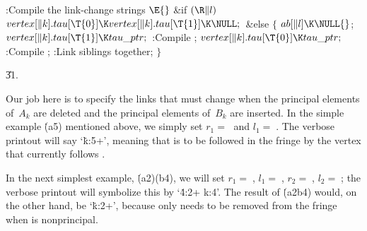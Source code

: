 \B{}:Compile the link-change strings \X${}\E{}$\6
\&{if} ${}(\R\|l){}$\1\5
${}\\{vertex}[\|k].\\{tau}[\T{0}]\K\\{vertex}[\|k].\\{tau}[\T{1}]\K\NULL;{}$\2\6
\&{else}\5
${}\{{}$\1\6
${}\\{ab}[\|l]\K\NULL{}$;\6
${}\\{vertex}[\|k].\\{tau}[\T{1}]\K\\{tau\_ptr};{}$\6
:Compile \X;\6
${}\\{vertex}[\|k].\\{tau}[\T{0}]\K\\{tau\_ptr};{}$\6
:Compile \X;\6
:Link siblings together\X;\6
\4${}\}{}$\2\par
\U31.\fi

Our job here is to specify the links that must change
when the
principal elements of~$A_k$ are deleted and the principal elements of~$B_k$
are inserted. In the simple example \.{(a5)} mentioned above,
we simply set $r_1=\;$ and $l_1=\;$. The
verbose printout will say `\.{k:5+}', meaning that  is to
be followed in the fringe by the vertex that currently follows .

In the next simplest example, \.{(a2)(b4)}, we will set
$r_1=\;$,
$l_1=\;$,
$r_2=\;$,
$l_2=\;$;
the verbose printout will symbolize this by `\.{4:2+ k:4}'.
The result of \.{(a2b4)} would, on the other hand, be `\.{k:2+}',
because only  needs to be removed from the fringe when
 is nonprincipal.

